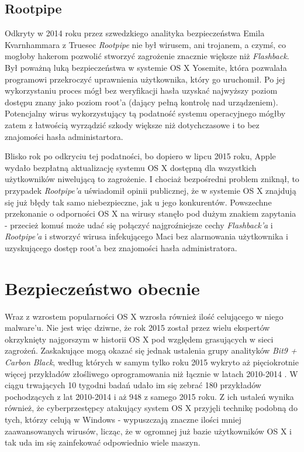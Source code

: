 \documentclass[polish]{kbk}
\begin{document}
\subsection{Rootpipe \cite{rootpipe}}
Odkryty w 2014 roku przez szwedzkiego analityka bezpieczeństwa Emila Kvarnhammara z Truesec \textit{Rootpipe} nie był wirusem, ani trojanem, a czymś, co mogłoby hakerom pozwolić stworzyć zagrożenie znacznie większe niż \textit{Flashback}. Był poważną luką bezpieczeństwa w systemie OS X Yosemite, która pozwalała programowi przekroczyć uprawnienia użytkownika, który go uruchomił. Po jej wykorzystaniu proces mógł bez weryfikacji hasła uzyskać najwyższy poziom dostępu znany jako poziom root'a (dający pełną kontrolę nad urządzeniem). Potencjalny wirus wykorzystujący tą podatność systemu operacyjnego mógłby zatem z łatwością wyrządzić szkody większe niż dotychczasowe i to bez znajomości hasła administartora.

Blisko rok po odkryciu tej podatności, bo dopiero w lipcu 2015 roku, Apple wydało bezpłatną aktualizację systemu OS X dostępną dla wszystkich użytkowników niwelującą to zagrożenie. I chociaż bezpośredni problem zniknął, to przypadek \textit{Rootpipe'a} uświadomił opinii publicznej, że w systemie OS X znajdują się już błędy tak samo niebezpieczne, jak u jego konkurentów. Powszechne przekonanie o odporności OS X na wirusy stanęło pod dużym znakiem zapytania - przecież komuś może udać się połączyć najgroźniejsze cechy \textit{Flashback'a} i \textit{Rootpipe'a} i stworzyć wirusa infekującego Maci bez alarmowania użytkownika i uzyskującego dostęp root'a bez znajomości hasła administratora.

\section{Bezpieczeństwo obecnie}
Wraz z wzrostem popularności OS X wzrosła również ilość celującego w niego malware'u. Nie jest więc dziwne, że rok 2015 został przez wielu ekspertów okrzyknięty najgorszym w historii OS X pod względem grasujących w sieci zagrożeń. Zaskakujące mogą okazać się jednak ustalenia grupy analityków \textit{Bit9 + Carbon Black}, według których w samym tylko roku 2015 wykryto aż pięciokrotnie więcej przykładów złośliwego oprogramowania niż łącznie w latach 2010-2014 \cite{stats}. W ciągu trwających 10 tygodni badań udało im się zebrać 180 przykładów pochodzących z lat 2010-2014 i aż 948 z samego 2015 roku. Z ich ustaleń wynika również, że cyberprzestępcy atakujący system OS X przyjęli technikę podobną do tych, którzy celują w Windows - wypuszczają znaczne ilości mniej zaawansowanych wirusów, licząc, że w ogromnej już bazie użytkowników OS X i tak uda im się zainfekować odpowiednio wiele maszyn.
\end{document}
